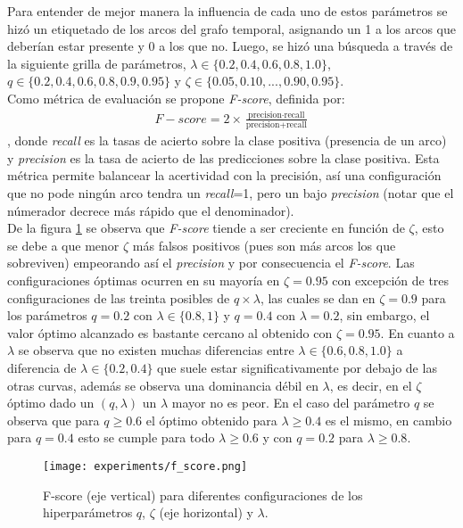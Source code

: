 \documentclass[letterpaper,12pt,oneside]{book} %
\begin{document}
Para entender de mejor manera la influencia de cada uno de estos parámetros se hizó un etiquetado de los arcos del grafo temporal, asignando un 1 a los arcos que deberían estar presente y 0 a los que no. Luego, se hizó una búsqueda a través de la siguiente grilla de parámetros, $\lambda \in \{0.2, 0.4, 0.6, 0.8, 1.0\}$, $q \in \{0.2, 0.4, 0.6, 0.8, 0.9, 0.95\}$ y $\zeta \in \{0.05, 0.10, ..., 0.90, 0.95\}$.\\

Como métrica de evaluación se propone \textit{F-score}, definida por:
\begin{align}
    F-score = 2\times \frac{\text{precision}\cdot \text{recall}}{\text{precision}+\text{recall}}
\end{align}
, donde \textit{recall} es la tasas de acierto sobre la clase positiva (presencia de un arco) y \textit{precision} es la tasa de acierto de las predicciones sobre la clase positiva. Esta métrica permite balancear la acertividad con la precisión, así una configuración que no pode ningún arco tendra un \textit{recall}=1, pero un bajo \textit{precision} (notar que el númerador decrece más rápido que el denominador). \\

De la figura \ref{img:f_score} se observa que \textit{F-score} tiende a ser creciente en función de $\zeta$, esto se debe a que menor $\zeta$ más falsos positivos (pues son más arcos los que sobreviven) empeorando así el \textit{precision} y por consecuencia el \textit{F-score}. Las configuraciones óptimas ocurren en su mayoría en $\zeta=0.95$ con excepción de tres configuraciones de las treinta posibles de $q\times \lambda$, las cuales se dan en $\zeta=0.9$ para los parámetros $q=0.2$ con $\lambda \in \{0.8, 1\}$ y $q=0.4$ con $\lambda=0.2$, sin embargo, el valor óptimo alcanzado es bastante cercano al obtenido con $\zeta=0.95$. En cuanto a $\lambda$ se observa que no existen muchas diferencias entre $\lambda\in\{0.6, 0.8, 1.0\}$ a diferencia de $\lambda \in \{0.2, 0.4\}$ que suele estar significativamente por debajo de las otras curvas, además se observa una dominancia débil en $\lambda$, es decir, en el $\zeta$ óptimo dado un $(q, \lambda)$ un $\lambda$ mayor no es peor. En el caso del parámetro $q$ se observa que para $q\geq 0.6$ el óptimo obtenido para $\lambda\geq 0.4$ es el mismo, en cambio para $q=0.4$ esto se cumple para todo $\lambda\geq 0.6$ y con $q=0.2$ para $\lambda \geq 0.8$. 

\begin{figure}
    \centering
    \texttt{[image: experiments/f\_score.png]}
    \caption{F-score (eje vertical) para diferentes configuraciones de los hiperparámetros $q$, $\zeta$ (eje horizontal) y $\lambda$.}
    \label{img:f_score}
\end{figure}
\end{document}
